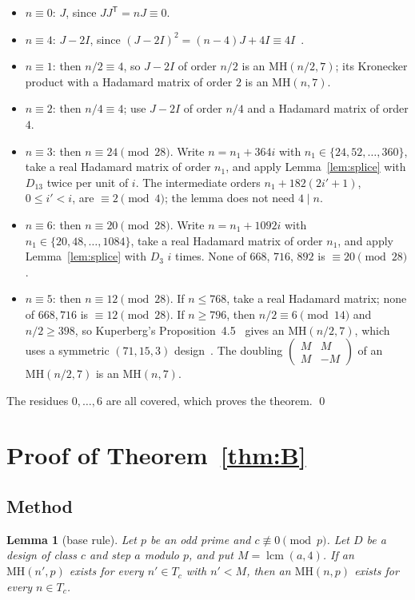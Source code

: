 \documentclass[10pt]{article}
\newtheorem{lemma}{Lemma}
\theoremstyle{remark}
\newcommand{\MH}{\mathrm{MH}}
\begin{document}
\begin{itemize}
\item $n\equiv0$: $J$, since $JJ^{\mathsf T}=nJ\equiv0$.
\item $n\equiv4$: $J-2I$, since $(J-2I)^2=(n-4)J+4I\equiv4I$~\cite[Lemma~2.3]{K}.
\item $n\equiv1$: then $n/2\equiv4$, so $J-2I$ of order $n/2$ is an $\mathrm{MH}(n/2,7)$; its Kronecker product with a Hadamard matrix of order $2$ is an $\mathrm{MH}(n,7)$.
\item $n\equiv2$: then $n/4\equiv4$; use $J-2I$ of order $n/4$ and a Hadamard matrix of order $4$.
\item $n\equiv3$: then $n\equiv24\pmod{28}$. Write $n=n_1+364i$ with $n_1\in\{24,52,\dots,360\}$, take a real Hadamard matrix of order $n_1$, and apply Lemma~\ref{lem:splice} with $D_{13}$ twice per unit of $i$. The intermediate orders $n_1+182(2i'+1)$, $0\le i'<i$, are $\equiv2\pmod4$; the lemma does not need $4\mid n$.
\item $n\equiv6$: then $n\equiv20\pmod{28}$. Write $n=n_1+1092i$ with $n_1\in\{20,48,\dots,1084\}$, take a real Hadamard matrix of order $n_1$, and apply Lemma~\ref{lem:splice} with $D_3$ $i$ times. None of $668$, $716$, $892$ is $\equiv20\pmod{28}$.
\item $n\equiv5$: then $n\equiv12\pmod{28}$. If $n\le768$, take a real Hadamard matrix; none of $668,716$ is $\equiv12\pmod{28}$. If $n\ge796$, then $n/2\equiv6\pmod{14}$ and $n/2\ge398$, so Kuperberg's Proposition~4.5~\cite{K} gives an $\mathrm{MH}(n/2,7)$, which uses a symmetric $(71,15,3)$ design~\cite{G00,R01}. The doubling $\left(\begin{smallmatrix}M&M\\ M&-M\end{smallmatrix}\right)$ of an $\mathrm{MH}(n/2,7)$ is an $\mathrm{MH}(n,7)$.
\end{itemize}
The residues $0,\dots,6$ are all covered, which proves the theorem. \qed

\section{Proof of Theorem~\ref{thm:B}}\label{sec:B}

\subsection{Method}
\begin{lemma}[base rule]\label{lem:base}
Let $p$ be an odd prime and $c\not\equiv0\pmod p$. Let $D$ be a design of class $c$ and step $a$ modulo $p$, and put $M=\operatorname{lcm}(a,4)$. If an $\MH(n',p)$ exists for every $n'\in T_c$ with $n'<M$, then an $\MH(n,p)$ exists for every $n\in T_c$.
\end{lemma}
\end{document}

